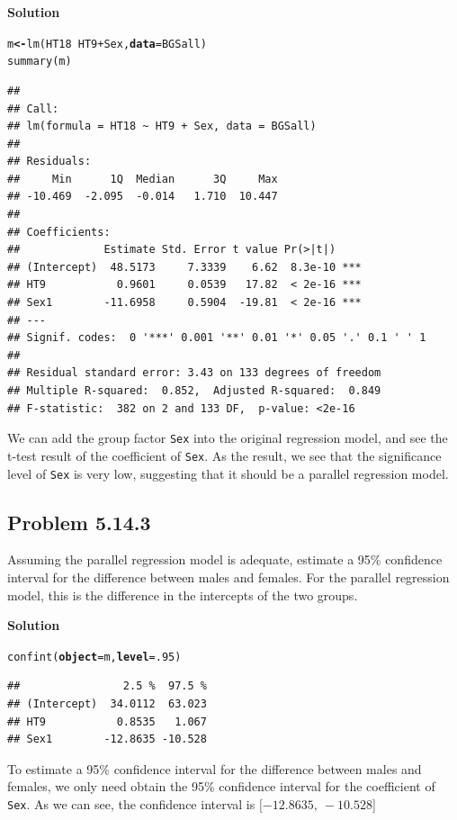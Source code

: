 \documentclass[12pt,oneside,a4paper]{article}\usepackage[]{graphicx}\usepackage[]{xcolor}
\makeatletter
\newcommand{\hlnum}[1]{\textcolor[rgb]{0,0,0}{#1}}%
\newcommand{\hlopt}[1]{\textcolor[rgb]{0,0,0}{#1}}%
\newcommand{\hlstd}[1]{\textcolor[rgb]{0,0,0}{#1}}%
\newcommand{\hlkwb}[1]{\textcolor[rgb]{0.498,0,0.333}{\textbf{#1}}}%
\newcommand{\hlkwc}[1]{\textcolor[rgb]{0.498,0,0.333}{\textbf{#1}}}%
\newcommand{\hlkwd}[1]{\textcolor[rgb]{0,0,0}{#1}}%
\newenvironment{kframe}{%
 \def\at@end@of@kframe{}%
 \ifinner\ifhmode%
  \def\at@end@of@kframe{\end{minipage}}%
  \begin{minipage}{\columnwidth}%
 \fi\fi%
 \def\FrameCommand##1{\hskip\@totalleftmargin \hskip-\fboxsep
 \colorbox{shadecolor}{##1}\hskip-\fboxsep
     \hskip-\linewidth \hskip-\@totalleftmargin \hskip\columnwidth}%
 \MakeFramed {\advance\hsize-\width
   \@totalleftmargin\z@ \linewidth\hsize
   \@setminipage}}%
 {\par\unskip\endMakeFramed%
 \at@end@of@kframe}
\newenvironment{knitrout}{}{} %
\newcommand{\subproblem}[1]
{
    \subsection*{Problem {#1}}
}
\newcommand{\solution}
{
    \vspace{15pt}
    \noindent\ignorespaces\textbf{\large Solution}
}
\newcommand{\m}[1]{\texttt{{#1}}}
\makeatother
\begin{document}
\solution

\begin{knitrout}
\color{fgcolor}\begin{kframe}
\begin{alltt}
\hlstd{m} \hlkwb{<-} \hlkwd{lm}\hlstd{(HT18} \hlopt{~} \hlstd{HT9} \hlopt{+} \hlstd{Sex,} \hlkwc{data} \hlstd{= BGSall)}
\hlkwd{summary}\hlstd{(m)}
\end{alltt}
\begin{verbatim}
## 
## Call:
## lm(formula = HT18 ~ HT9 + Sex, data = BGSall)
## 
## Residuals:
##     Min      1Q  Median      3Q     Max 
## -10.469  -2.095  -0.014   1.710  10.447 
## 
## Coefficients:
##             Estimate Std. Error t value Pr(>|t|)    
## (Intercept)  48.5173     7.3339    6.62  8.3e-10 ***
## HT9           0.9601     0.0539   17.82  < 2e-16 ***
## Sex1        -11.6958     0.5904  -19.81  < 2e-16 ***
## ---
## Signif. codes:  0 '***' 0.001 '**' 0.01 '*' 0.05 '.' 0.1 ' ' 1
## 
## Residual standard error: 3.43 on 133 degrees of freedom
## Multiple R-squared:  0.852,	Adjusted R-squared:  0.849 
## F-statistic:  382 on 2 and 133 DF,  p-value: <2e-16
\end{verbatim}
\end{kframe}
\end{knitrout}

We can add the group factor \m{Sex} into the original regression model, and see the t-test result of the coefficient of \m{Sex}. As the result, we see that the significance level of \m{Sex} is very low, suggesting that it should be a parallel regression model.

\subproblem{5.14.3}
Assuming the parallel regression model is adequate, estimate a 95\% confidence interval for the difference between males and females. For the parallel regression model, this is the difference in the intercepts of the two groups.

\solution
\begin{knitrout}
\color{fgcolor}\begin{kframe}
\begin{alltt}
\hlkwd{confint}\hlstd{(}\hlkwc{object} \hlstd{= m,} \hlkwc{level} \hlstd{=} \hlnum{.95}\hlstd{)}
\end{alltt}
\begin{verbatim}
##                2.5 %  97.5 %
## (Intercept)  34.0112  63.023
## HT9           0.8535   1.067
## Sex1        -12.8635 -10.528
\end{verbatim}
\end{kframe}
\end{knitrout}

To estimate a 95\% confidence interval for the difference between males and females, we only need obtain the 95\% confidence interval for the coefficient of \m{Sex}. As we can see, the confidence interval is $[-12.8635,~ -10.528$]
\end{document}
